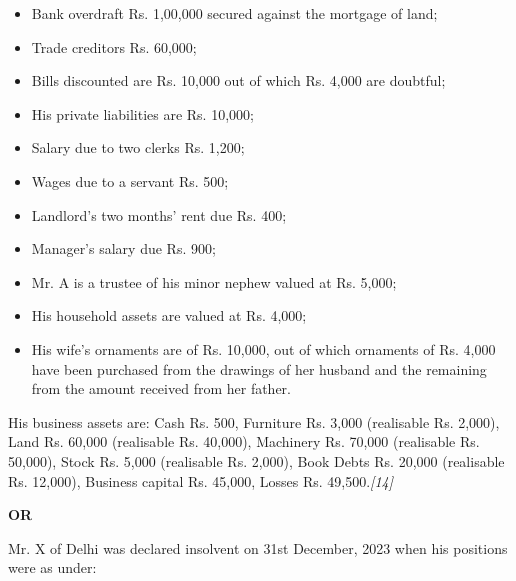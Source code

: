 \documentclass[11pt,a4paper]{article}
\newcommand{\pts}[1]{\hfill   \textit{[#1]}}
\begin{document}
\begin{itemize}
  \item Bank overdraft Rs. 1,00,000 secured against the mortgage of land;
  \item Trade creditors Rs. 60,000;
  \item Bills discounted are Rs. 10,000 out of which Rs. 4,000 are doubtful;
  \item His private liabilities are Rs. 10,000;
  \item Salary due to two clerks Rs. 1,200;
  \item Wages due to a servant Rs. 500;
  \item Landlord's two months' rent due Rs. 400;
  \item Manager's salary due Rs. 900;
  \item Mr. A is a trustee of his minor nephew valued at Rs. 5,000;
  \item His household assets are valued at Rs. 4,000;
  \item His wife's ornaments are of Rs. 10,000, out of which ornaments of Rs. 4,000 have been purchased from the drawings of her husband and the remaining from the amount received from her father.
\end{itemize}
His business assets are: Cash Rs. 500, Furniture Rs. 3,000 (realisable Rs. 2,000), Land Rs. 60,000 (realisable Rs. 40,000), Machinery Rs. 70,000 (realisable Rs. 50,000), Stock Rs. 5,000 (realisable Rs. 2,000), Book Debts Rs. 20,000 (realisable Rs. 12,000), Business capital Rs. 45,000, Losses Rs. 49,500.\pts{14}

\centerline{   \textbf{OR}}

Mr. X of Delhi was declared insolvent on 31st December, 2023 when his positions were as under:
\end{document}
